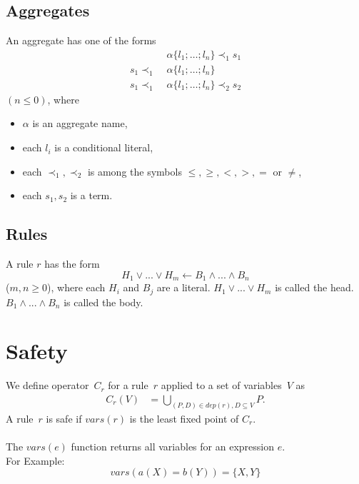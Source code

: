 \documentclass{article}
\newcommand{\set}[1]{\{#1\}}
\newcommand\Vars[1]{\mathit{vars}(#1)}
\newcommand\DP[1]{\mathit{dep}(#1)}
\newcommand\CheckOp[1]{C_{#1}}
\newcommand\CheckAp[2]{\CheckOp{#1}({#2})}
\begin{document}
	\subsection{Aggregates}
	An aggregate has one of the forms
	\begin{align}
		&\alpha\{l_1; \dots; l_n\} \prec_1 s_1 \label{aggregate1} \\
		s_1 \prec_1 \; &\alpha\{l_1; \dots; l_n\} \label{aggregate2} \\
		s_1 \prec_1 \; &\alpha\{l_1; \dots; l_n\} \prec_2 s_2 \label{aggregate3}
	\end{align}
	$(n \leq 0)$, where
	\begin{itemize}
		\item $\alpha$ is an aggregate name,
		\item each $l_i$ is a conditional literal,
		\item each $\prec_1, \prec_2$ is among the symbols $\leq,\ge,<,>,=$ or $\neq$,
		\item each $s_1, s_2$ is a term.
	\end{itemize}

	\subsection{Rules}

	A rule $r$ has the form
	\begin{equation}
		H_1 \lor ... \lor H_m  \leftarrow B_1 \land ... \land B_n \label{rule}
	\end{equation}
	($m, n \ge 0$), where each $H_i$ and $B_j$ are a literal.
	$H_1 \lor ... \lor H_m$ is called the head. $B_1 \land ... \land B_n$ is called the body.

	\section{Safety}
	We define operator~$\CheckOp{r}$ for a rule~$r$ applied to a set of variables~$V$ as
	\begin{align*}
	\CheckAp{r}{V} &= \bigcup_{(P,D) \in \DP{r}, D \subseteq V} P.
	\end{align*}
	A rule~$r$ is safe if $\Vars{r}$ is the least fixed point of $\CheckOp{r}$.
	\paragraph{}
	The $\mathit{vars(e)}$ function returns all variables for an expression $e$.
	\\ For Example:
	\begin{equation*}
		vars(a(X) = b(Y)) = \set{X,Y}
	\end{equation*}
\end{document}
